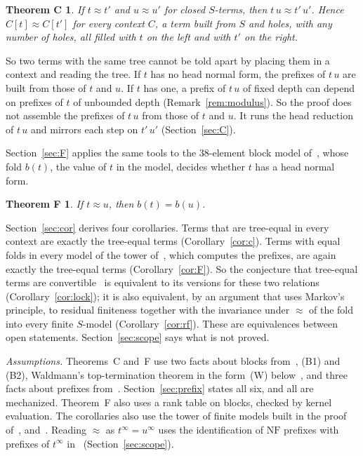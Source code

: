 \documentclass[11pt]{amsart}
\newtheorem*{thmC}{Theorem C}
\newtheorem*{thmF}{Theorem F}
\theoremstyle{definition}
\newcommand{\NF}{\mathrm{NF}}
\begin{document}
\begin{thmC}
If $t\approx t'$ and $u\approx u'$ for closed $S$-terms, then $t\,u\approx t'\,u'$. Hence
$C[t]\approx C[t']$ for every context $C$, a term built from $S$ and holes, with any number of holes, all filled with $t$ on the left
and with $t'$ on the right.
\end{thmC}

So two terms with the same tree cannot be told apart by placing them in a context and reading the
tree. If $t$ has no head normal form, the prefixes of $t\,u$ are built from those of $t$ and $u$.
If $t$ has one, a prefix of $t\,u$ of fixed depth can depend on prefixes of $t$ of unbounded depth
(Remark~\ref{rem:modulus}). So the proof does not assemble the prefixes of $t\,u$ from those of $t$
and $u$. It runs the head reduction of
$t\,u$ and mirrors each step on $t'\,u'$ (Section~\ref{sec:C}).

Section~\ref{sec:F} applies the same tools to the 38-element block model of~\citep{s1}, whose
fold $b(t)$, the value of $t$ in the model, decides whether $t$ has a head normal form.

\begin{thmF}
If $t\approx u$, then $b(t)=b(u)$.
\end{thmF}

Section~\ref{sec:cor} derives four corollaries. Terms that are tree-equal in every context are
exactly the tree-equal terms (Corollary~\ref{cor:c}). Terms with equal folds in every model of the
tower of~\citep{s6}, which computes the prefixes, are again exactly the tree-equal terms
(Corollary~\ref{cor:F}). So the conjecture that tree-equal terms are convertible~\citep[Conjecture~11]{s6}
is equivalent to its versions for these two relations (Corollary~\ref{cor:lock}); it is also
equivalent, by an argument that uses Markov's principle, to residual finiteness together with the invariance under $\approx$ of the
fold into every finite $S$-model (Corollary~\ref{cor:rf}). These are equivalences between open
statements. Section~\ref{sec:scope} says what is not proved.

\emph{Assumptions.} Theorems~C and~F use two facts about blocks from~\citep{s1}, (B1) and (B2),
Waldmann's top-termination theorem in the form~(W) below~\citep{s3}, and three facts about prefixes
from~\citep{s3}. Section~\ref{sec:prefix} states all six, and all are mechanized. Theorem~F also uses
a rank table on blocks, checked by kernel evaluation. The corollaries also use the tower of finite
models built in the proof of~\citep[Theorem~1]{s6}, and~\citep[Lemmas~4 and~10]{s6}. Reading $\approx$ as $t^\infty=u^\infty$
uses the identification of $\NF$ prefixes with prefixes of $t^\infty$ in~\citep{s3}
(Section~\ref{sec:scope}).
\end{document}
